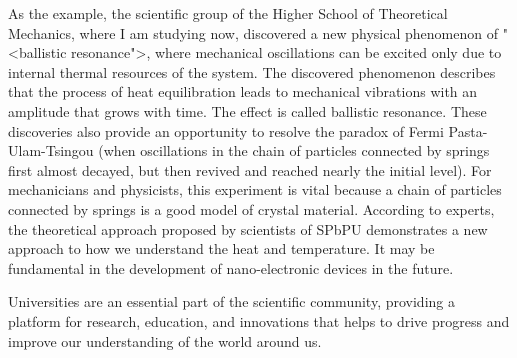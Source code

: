 \documentclass[main.tex]{subfiles}
\begin{document}
As the example, the scientific group of the Higher School of Theoretical Mechanics, where I am studying now, discovered a new physical phenomenon of "<ballistic resonance">, where mechanical oscillations can be excited only due to internal thermal resources of the system.
The discovered phenomenon describes that the process of heat equilibration leads to mechanical vibrations with an amplitude that grows with time.
The effect is called ballistic resonance.
These discoveries also provide an opportunity to resolve the paradox of Fermi Pasta-Ulam-Tsingou (when oscillations in the chain of particles connected by springs first almost decayed, but then revived and reached nearly the initial level).
For mechanicians and physicists, this experiment is vital because a chain of particles connected by springs is a good model of crystal material.
According to experts, the theoretical approach proposed by scientists of SPbPU demonstrates a new approach to how we understand the heat and temperature.
It may be fundamental in the development of nano-electronic devices in the future.

Universities are an essential part of the scientific community, providing a platform for research, education, and innovations that helps to drive progress and improve our understanding of the world around us.
\newpage


\setcounter{subsection}{5}

\newpage

\setcounter{subsection}{6}

\newpage

\setcounter{subsection}{7}

\newpage

\setcounter{subsection}{8}
\end{document}

